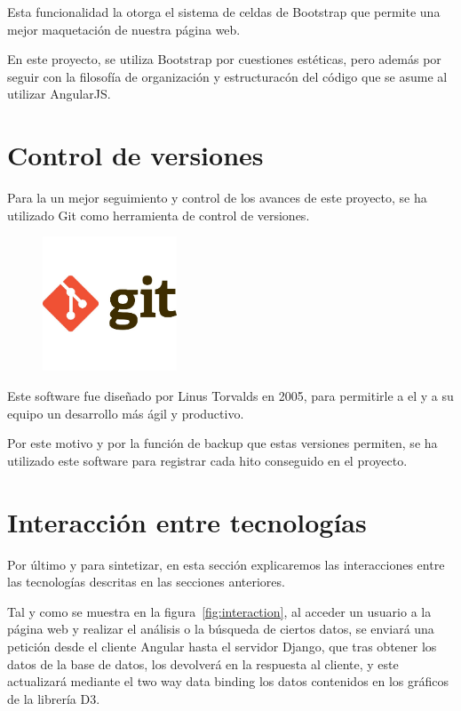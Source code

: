 \documentclass[a4paper, spanish, 12pt]{book}
\begin{document}
Esta funcionalidad la otorga el sistema de celdas de Bootstrap que permite una
mejor maquetaci\'on de nuestra p\'agina web.

En este proyecto, se utiliza Bootstrap por cuestiones est\'eticas, pero adem\'as por
seguir con la filosof\'ia de organizaci\'on y estructurac\'on del c\'odigo que se
asume al utilizar AngularJS.

\section{Control de versiones}
\label{sec:git}

Para la un mejor seguimiento y control de los avances de este proyecto, se ha
utilizado Git como herramienta de control de versiones.

\begin{figure}[H]
  \centering
  \includegraphics[width=4cm, keepaspectratio]{img/git-logo}
\end{figure}

Este software fue dise\~nado por Linus Torvalds en 2005, para permitirle a el
y a su equipo un desarrollo m\'as \'agil y productivo.

Por este motivo y por la funci\'on de backup que estas versiones permiten,
se ha utilizado este software para registrar cada hito conseguido en el proyecto.

\section{Interacci\'on entre tecnolog\'ias}
\label{sec:interaction}

Por \'ultimo y para sintetizar, en esta secci\'on explicaremos las interacciones
entre las tecnolog\'ias descritas en las secciones anteriores.

Tal y como se muestra en la figura~\ref{fig:interaction}, al acceder un usuario
a la p\'agina web y realizar el an\'alisis o la b\'usqueda de ciertos datos, se enviar\'a
una petici\'on desde el cliente Angular hasta el servidor Django, que tras obtener
los datos de la base de datos, los devolver\'a en la respuesta al cliente, y este
actualizar\'a mediante el two way data binding los datos contenidos en los gr\'aficos
de la librer\'ia D3.
\end{document}
